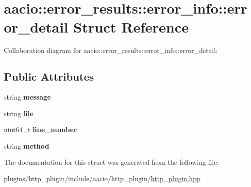 \hypertarget{structaacio_1_1error__results_1_1error__info_1_1error__detail}{}\section{aacio\+:\+:error\+\_\+results\+:\+:error\+\_\+info\+:\+:error\+\_\+detail Struct Reference}
\label{structaacio_1_1error__results_1_1error__info_1_1error__detail}


Collaboration diagram for aacio\+:\+:error\+\_\+results\+:\+:error\+\_\+info\+:\+:error\+\_\+detail\+:
\subsection*{Public Attributes}
\begin{DoxyCompactItemize}
\item 
\mbox{\label{structaacio_1_1error__results_1_1error__info_1_1error__detail_a91d1b746a847f7c1db0059f8791603e3}} 
string {\bfseries message}
\item 
\mbox{\label{structaacio_1_1error__results_1_1error__info_1_1error__detail_ac319eacc4914b8906b301db6270d75fa}} 
string {\bfseries file}
\item 
\mbox{\label{structaacio_1_1error__results_1_1error__info_1_1error__detail_ac8b8469feee324836f95ac0216bc31b2}} 
uint64\+\_\+t {\bfseries line\+\_\+number}
\item 
\mbox{\label{structaacio_1_1error__results_1_1error__info_1_1error__detail_afb1944fa8599b66ef5812473f7bf53a6}} 
string {\bfseries method}
\end{DoxyCompactItemize}


The documentation for this struct was generated from the following file\+:\begin{DoxyCompactItemize}
\item 
plugins/http\+\_\+plugin/include/aacio/http\+\_\+plugin/\mbox{\hyperlink{http__plugin_8hpp}{http\+\_\+plugin.\+hpp}}\end{DoxyCompactItemize}

